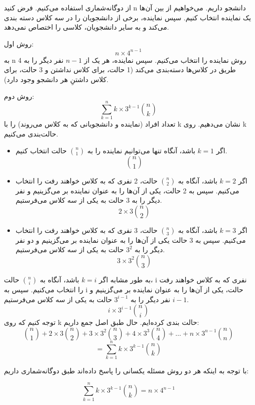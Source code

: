 \p
از دوگانه‌شماری استفاده می‌کنیم.
فرض کنید n دانشجو داریم. می‌خواهیم از بین آن‌ها یک نماینده انتخاب کنیم. سپس نماینده، برخی از دانشجویان را در سه کلاس دسته بندی می‌کند و به سایر دانشجویان، کلاسی را اختصاص نمی‌دهد.

\p
 روش اول:\[n\times4^{n-1}\] 
 به n 
 روش نماینده را انتخاب می‌کنیم.
  سپس نماینده، هر یک از 
 $n-1$ 
 نفر دیگر را به 4 طریق در کلاس‌ها دسته‌بندی می‌کند 
(1 حالت، برای کلاس نداشتن و 3 حالت، برای کلاس داشتنِ هر دانشجو وجود دارد).

\p

روش دوم:\[\sum\limits_{k=1}^{n}k\times3^{k-1}\binom{n}{k}\] 
 تعداد افراد (نماینده و دانشجویانی که به کلاس می‌روند) را با 
 k نشان می‌دهیم. 
 روی k
  حالت‌بندی می‌کنیم.
\begin{itemize}
\item    
اگر 
$k = 1$
 باشد، آنگاه تنها می‌توانیم نماینده را به 
$\binom{n}{1}$
حالت
انتخاب کنیم.
 \[\binom{n}{1}\]
\item 
اگر 
$k = 2$
 باشد، آنگاه به
$\binom{n}{2}$
حالت، 2 نفری که به کلاس خواهند رفت را انتخاب می‌کنیم. سپس به 2 حالت، یکی از آن‌ها را به عنوان نماینده بر می‌گزینیم و نفر دیگر را به 3 حالت به یکی از سه کلاس می‌فرستیم.
\[2\times3\binom{n}{2}\]
\item 
اگر 
$k = 3$
باشد، آنگاه به
$\binom{n}{3}$
حالت، 3 نفری که به کلاس خواهند رفت را انتخاب می‌کنیم. سپس به 3 حالت یکی از آن‌ها را به عنوان نماینده بر می‌گزینیم و دو نفر دیگر را به 
$3^2$
حالت به یکی از سه کلاس می‌فرستیم.
\[3\times3^2\binom{n}{3}\]
\end{itemize} 
 به طور مشابه اگر
 $k = i$
 باشد، آنگاه به
 $\binom{n}{i}$
 حالت،
  i
  نفری که به کلاس خواهند رفت را انتخاب می‌کنیم.
   سپس به i
   حالت، یکی از آن‌ها را به عنوان نماینده بر می‌گزینیم و 
   $i-1$
   نفر دیگر را به
    $3^{i-1}$ 
    حالت به یکی از سه کلاس می‌فرستیم.
    \[i\times3^{i-1}\binom{n}{i}\]
 توجه کنیم که روی 
k
  حالت بندی کرده‌ایم. حال طبق اصل جمع داریم:    
  $$\binom{n}{1} + 2\times3\binom{n}{2} + 3\times3^2\binom{n}{3} + 4\times3^3\binom{n}{4} +\ldots +
  n\times3^{n-1}\binom{n}{n}$$ 
  $$= \sum\limits_{k=1}^{n}k\times3^{k-1}\binom{n}{k}$$
 
\p
با توجه به اینکه هر دو روش مسئله یکسانی را پاسخ داده‌اند طبق دوگانه‌شماری داریم:

$$\sum\limits_{k=1}^{n}k\times3^{k-1}\binom{n}{k} = n\times4^{n-1}$$
